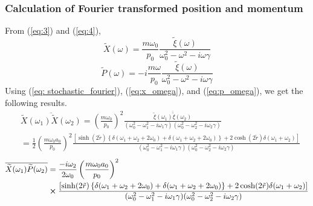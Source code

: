 \documentclass[12pt, twoside]{article}
\begin{document}
\subsubsection{Calculation of Fourier transformed position and momentum}
From (\ref{eq:3}) and (\ref{eq:4}), \begin{equation}\label{eq:x_omega}
\widetilde{X}(\omega) = \frac{m \omega_0}{p_0} \frac { \widetilde { \xi } ( \omega ) } { \omega _ { 0 } ^ { 2 } - \omega ^ { 2 } - i \omega \gamma }
\end{equation}
\begin{equation}\label{eq:p_omega}
\widetilde{P}(\omega) = -i\frac{m \omega}{p_0} \frac { \widetilde { \xi } ( \omega ) } { \omega _ { 0 } ^ { 2 } - \omega ^ { 2 } - i \omega \gamma }
\end{equation}
Using (\ref{eq: stochastic_fourier}), (\ref{eq:x_omega}), and (\ref{eq:p_omega}), we get the following results.
\begin{equation}\label{eq:x_corr_fourier}
\begin{aligned} &\overline{\widetilde { X } ( \omega_1 )\widetilde { X } ( \omega_2 )} = \left(\frac { m \omega _ { 0 } } { p _ { 0 } }\right)^2 \frac {\overline{ \widetilde { \xi } ( \omega_1 )\widetilde { \xi } ( \omega_2 ) }} {( \omega _ { 0 } ^ { 2 } - \omega_1 ^ { 2 } - i \omega_1 \gamma)(\omega _ { 0 } ^ { 2 } - \omega_2 ^ { 2 } - i \omega_2 \gamma) }
\\ & = \frac{1}{2} \left(\frac { m \omega _ { 0 } a_0 } { p _ { 0 } }\right)^2 \frac{\left[\sinh(2\tilde{r})\left\{\delta(\omega_1 + \omega_2 + 2\omega_0)+\delta(\omega_1 + \omega_2 + 2\omega_0)\right\} + 2\cosh(2\tilde{r})\delta(\omega_1 + \omega_2)\right]}{( \omega _ { 0 } ^ { 2 } - \omega_1 ^ { 2 } - i \omega_1 \gamma)(\omega _ { 0 } ^ { 2 } - \omega_2 ^ { 2 } - i \omega_2 \gamma)}
\end{aligned}
\end{equation}
\begin{equation}\begin{aligned}
\overline{\widetilde { X } ( \omega_1 )\widetilde { P } ( \omega_2 )} & = \frac{-i\omega_2}{2\omega_0} \left(\frac { m \omega_0 a_0 } { p _ { 0 } }\right)^2 \\&\cross \frac{\left[\sinh(2\tilde{r})\left\{\delta(\omega_1 + \omega_2 + 2\omega_0)+\delta(\omega_1 + \omega_2 + 2\omega_0)\right\} + 2\cosh(2\tilde{r})\delta(\omega_1 + \omega_2)\right]}{( \omega _ { 0 } ^ { 2 } - \omega_1 ^ { 2 } - i \omega_1 \gamma)(\omega _ { 0 } ^ { 2 } - \omega_2 ^ { 2 } - i \omega_2 \gamma)} \end{aligned}
\end{equation}
\end{document}
